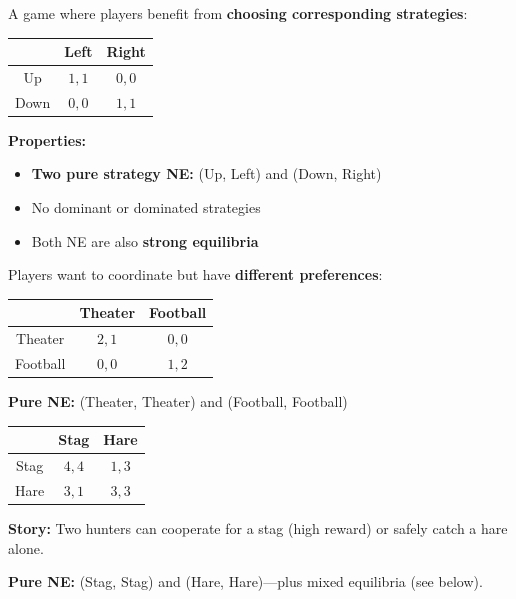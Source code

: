\begin{defbox}
A game where players benefit from \textbf{choosing corresponding strategies}:
\begin{center}
\renewcommand{\arraystretch}{1.2}
\begin{tabular}{@{} c | c c @{}}
 & Left & Right \\
\midrule
Up & $1, 1$ & $0, 0$ \\
Down & $0, 0$ & $1, 1$ \\
\end{tabular}
\end{center}

\textbf{Properties:}
\begin{itemize}
  \item \textbf{Two pure strategy NE:} (Up, Left) and (Down, Right)
  \item No dominant or dominated strategies
  \item Both NE are also \textbf{strong equilibria}
\end{itemize}
\end{defbox}

\begin{exbox}
Players want to coordinate but have \textbf{different preferences}:
\begin{center}
\renewcommand{\arraystretch}{1.2}
\begin{tabular}{@{} c | c c @{}}
 & Theater & Football \\
\midrule
Theater & $2, 1$ & $0, 0$ \\
Football & $0, 0$ & $1, 2$ \\
\end{tabular}
\end{center}

\textbf{Pure NE:} (Theater, Theater) and (Football, Football)
\end{exbox}

\begin{exbox}
\begin{center}
\renewcommand{\arraystretch}{1.2}
\begin{tabular}{@{} c | c c @{}}
 & Stag & Hare \\
\midrule
Stag & $4, 4$ & $1, 3$ \\
Hare & $3, 1$ & $3, 3$ \\
\end{tabular}
\end{center}

\textbf{Story:} Two hunters can cooperate for a stag (high reward) or safely catch a hare alone.

\textbf{Pure NE:} (Stag, Stag) and (Hare, Hare)---plus mixed equilibria (see below).
\end{exbox}

